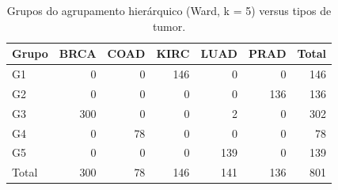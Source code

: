 \begin{table}[htbp]
\caption{Grupos do agrupamento hierárquico (Ward, k = 5) versus tipos de tumor.}
\label{tab:contingencia_hierarquico}
\begin{tabular}{lrrrrrr}
\toprule
Grupo & BRCA & COAD & KIRC & LUAD & PRAD & Total \\
\midrule
G1 & 0 & 0 & 146 & 0 & 0 & 146 \\
G2 & 0 & 0 & 0 & 0 & 136 & 136 \\
G3 & 300 & 0 & 0 & 2 & 0 & 302 \\
G4 & 0 & 78 & 0 & 0 & 0 & 78 \\
G5 & 0 & 0 & 0 & 139 & 0 & 139 \\
Total & 300 & 78 & 146 & 141 & 136 & 801 \\
\bottomrule
\end{tabular}
\end{table}
